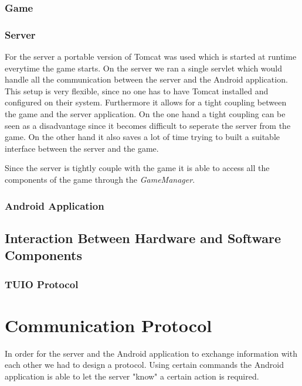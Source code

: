 \documentclass[a4paper,10pt]{article}
\begin{document}
		\subsubsection{Game}
		
		
		\subsubsection{Server}
		For the server a portable version of Tomcat was used which is started at runtime everytime the game starts.
		On the server we ran a single servlet which would handle all the communication between the server and the Android application.
		This setup is very flexible, since no one has to have Tomcat installed and configured on their system.
		Furthermore it allows for a tight coupling between the game and the server application.
		On the one hand a tight coupling can be seen as a disadvantage since it becomes difficult to seperate the server from the game.
		On the other hand it also saves a lot of time trying to built a suitable interface between the server and the game.
				
		Since the server is tightly couple with the game it is able to access all the components of the game through the \emph{GameManager}.
		
		\subsubsection{Android Application}
		
	\subsection{Interaction Between Hardware and Software Components}
	
		\subsubsection{TUIO Protocol}
		
\section{Communication Protocol}
\label{sec:communication-protocol}
In order for the server and the Android application to exchange information with each other we had to design a protocol.
Using certain commands the Android application is able to let the server "know" a certain action is required.
\end{document}
